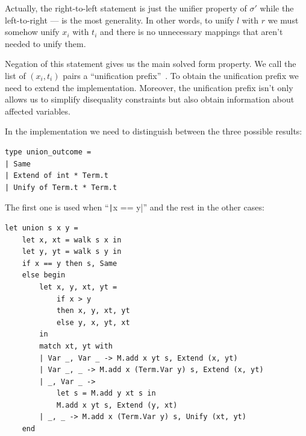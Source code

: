 Actually, the right-to-left statement is just the unifier property of $\sigma'$ while the left-to-right --- is the most generality. In other words, to unify $l$ with $r$ we must somehow unify $x_i$ with $t_i$ and there is no unnecessary mappings that aren't needed to unify them.

Negation of this statement gives us the main solved form property. We call the list of $(x_i, t_i)$ pairs a ``unification prefix''~\cite{friedman2009relational}. To obtain the unification prefix we need to extend the implementation. Moreover, the unification prefix isn't only allows us to simplify disequality constraints but also obtain information about affected variables.

In the \union implementation we need to distinguish between the three possible results:
\begin{verbatim}
type union_outcome =
| Same
| Extend of int * Term.t
| Unify of Term.t * Term.t
\end{verbatim}

The first one is used when ``\texttt|x == y|'' and the rest in the other cases:
\begin{verbatim}
let union s x y =
    let x, xt = walk s x in
    let y, yt = walk s y in
    if x == y then s, Same
    else begin
        let x, y, xt, yt =
            if x > y
            then x, y, xt, yt
            else y, x, yt, xt
        in
        match xt, yt with
        | Var _, Var _ -> M.add x yt s, Extend (x, yt)
        | Var _, _ -> M.add x (Term.Var y) s, Extend (x, yt)
        | _, Var _ ->
            let s = M.add y xt s in
            M.add x yt s, Extend (y, xt)
        | _, _ -> M.add x (Term.Var y) s, Unify (xt, yt)
    end
\end{verbatim}

